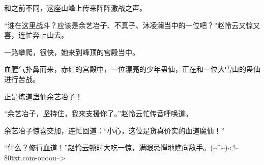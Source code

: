 \begin{this_body}
和之前不同，这座山峰上传来阵阵激战之声。

“谁在这里战斗？应该是余艺冶子、不真子、沐凌澜当中的一位吧？”赵怜云又惊又喜，连忙奔上山去。

一路攀爬，很快，她来到峰顶的宫殿当中。

血腥气扑鼻而来，赤红的宫殿中，一位漂亮的少年蛊仙，正在和一位大雪山的蛊仙进行苦战。

正是炼道蛊仙余艺冶子！

“余艺冶子，坚持住，我来支援你了。”赵怜云忙传音呼唤道。

余艺冶子惊喜交加，连忙回道：“小心，这位是货真价实的血道魔仙！”

“什么？修行血道！”赵怜云顿时大吃一惊，满眼忌惮地瞧向敌手。(\~{}\^{}\~{})<!--80txt.com-ouoou-->

\end{this_body}

